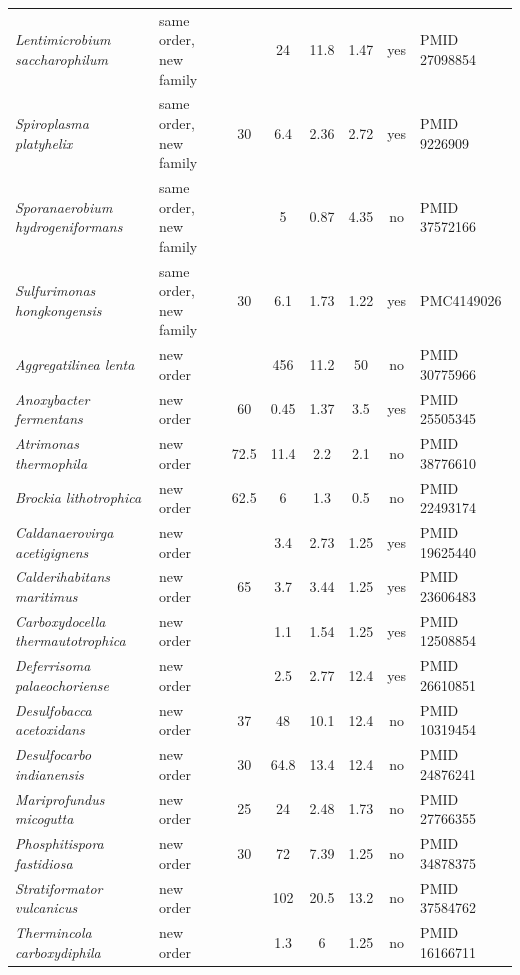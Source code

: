 {\begin{longtable}{llcccccl}
\textit{Lentimicrobium saccharophilum} & same order, new family &  & 24 & 11.8 & 1.47 & yes & PMID 27098854 \\
\textit{Spiroplasma platyhelix} & same order, new family & 30 & 6.4 & 2.36 & 2.72 & yes & PMID 9226909 \\
\textit{Sporanaerobium hydrogeniformans} & same order, new family &  & 5 & 0.87 & 4.35 & no & PMID 37572166 \\
\textit{Sulfurimonas hongkongensis} & same order, new family & 30 & 6.1 & 1.73 & 1.22 & yes & PMC4149026 \\
\textit{Aggregatilinea lenta} & new order &  & 456 & 11.2 & 50 & no & PMID 30775966 \\
\textit{Anoxybacter fermentans} & new order & 60 & 0.45 & 1.37 & 3.5 & yes & PMID 25505345 \\
\textit{Atrimonas thermophila} & new order & 72.5 & 11.4 & 2.2 & 2.1 & no & PMID 38776610 \\
\textit{Brockia lithotrophica} & new order & 62.5 & 6 & 1.3 & 0.5 & no & PMID 22493174 \\
\textit{Caldanaerovirga acetigignens} & new order &  & 3.4 & 2.73 & 1.25 & yes & PMID 19625440 \\
\textit{Calderihabitans maritimus} & new order & 65 & 3.7 & 3.44 & 1.25 & yes & PMID 23606483 \\
\textit{Carboxydocella thermautotrophica} & new order &  & 1.1 & 1.54 & 1.25 & yes & PMID 12508854 \\
\textit{Deferrisoma palaeochoriense} & new order &  & 2.5 & 2.77 & 12.4 & yes & PMID 26610851 \\
\textit{Desulfobacca acetoxidans} & new order & 37 & 48 & 10.1 & 12.4 & no & PMID 10319454 \\
\textit{Desulfocarbo indianensis} & new order & 30 & 64.8 & 13.4 & 12.4 & no & PMID 24876241 \\
\textit{Mariprofundus micogutta} & new order & 25 & 24 & 2.48 & 1.73 & no & PMID 27766355 \\
\textit{Phosphitispora fastidiosa} & new order & 30 & 72 & 7.39 & 1.25 & no & PMID 34878375 \\
\textit{Stratiformator vulcanicus} & new order &  & 102 & 20.5 & 13.2 & no & PMID 37584762 \\
\textit{Thermincola carboxydiphila} & new order &  & 1.3 & 6 & 1.25 & no & PMID 16166711 \\
\bottomrule
\end{longtable}}
